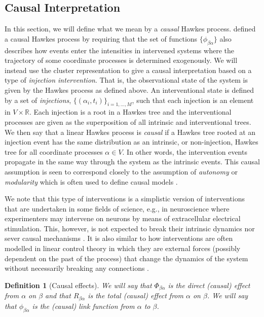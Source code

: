 \documentclass[accepted]{uai2021} %
\newtheorem{defn}[thm]{Definition}
\begin{document}

\subsection{Causal Interpretation}

In this section, we will define what we mean by a {\it causal} Hawkes process. 
\cite{mogensenUAI2020} defined a causal Hawkes process by requiring that the 
set 
of functions $\{\phi_{\beta\alpha}\}$ also describes how events enter the 
intensities in intervened systems where the trajectory of some 
coordinate processes is determined exogenously. We will instead use the cluster 
representation to give a causal
interpretation based on a type of \emph{injection intervention}. That is, the 
observational state of the system is given by the Hawkes process as defined 
above. An interventional state is defined by a set of \emph{injections}, 
$\{(\alpha_i, t_i) \}_{i =1,\ldots, M} $, such that each injection is an 
element in $V\times \mathbb{R}$. Each injection is 
a root in a Hawkes tree and the interventional processes are given as the 
superposition of all intrinsic and interventional trees. We then say that a 
linear Hawkes process is {\it 
causal} if a Hawkes tree rooted at an injection event has the same distribution 
as an 
intrinsic, or non-injection, Hawkes tree for all coordinate processes $\alpha 
\in V$. In 
other words, the intervention events 
propagate in the same way through the system as the intrinsic events. This 
causal assumption is seen to correspond closely to 
the assumption of \emph{autonomy} or \emph{modularity} which is often used to 
define causal models 
\citep{pearl2009, petersElements2017}.

We note that this type of interventions is a simplistic version of 
interventions that are undertaken in some fields of 
science, e.g., in neuroscience where experimenters may intervene on neurons by 
means of extracellular electrical stimulation. This, however, is not expected 
to break their intrinsic dynamics nor 
sever causal mechanisms \citep{meffin2012, komarov2019}. It is also similar to 
how interventions are 
often 
modelled in linear control theory in which they are external forces (possibly 
dependent on the past of the process) that change the dynamics of the system 
without necessarily breaking any connections \citep{aastrom2008, zabczyk2020}.

\begin{defn}[Causal effects]
	We will say that $\Phi_{\beta\alpha}$ is the \emph{direct (causal) effect} 
	from 
	$\alpha$ on $\beta$ and that $R_{\beta\alpha}$ is the \emph{total (causal) 
	effect} from $\alpha$ on $\beta$. We will say that $\phi_{\beta\alpha}$ is 
	the 
	{\it (causal) link function} from $\alpha$ to $\beta$.
	\label{def:cauEff}
\end{defn}
\end{document}
